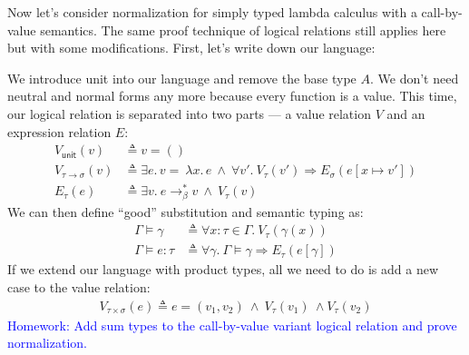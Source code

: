 \documentclass{notes}
\begin{document}
Now let's consider normalization for simply typed lambda calculus with a call-by-value semantics.
%
The same proof technique of logical relations still applies here but with some modifications.
%
First, let's write down our language:
%
\begin{syntax}
  \category[Types]{\tau, \sigma}
  \alternative{\tau \rightarrow \sigma}

  \alternative{()}

  \alternative{()}
\end{syntax}
%
We introduce unit into our language and remove the base type $A$.
%
We don't need neutral and normal forms any more because every function is a value.
%
This time, our logical relation is separated into two parts --- a value relation $V$ and an expression relation $E$:
%
\begin{align*}
  V_{\textsf{unit}}(v) & \triangleq v = () \\
  V_{\tau \rightarrow \sigma}(v) & \triangleq \exists e.\, v=\ \lambda x.\, e \ \wedge \ \forall v'.\ V_{\tau}(v') \Longrightarrow E_{\sigma}(e[x\mapsto v']) \\
  E_{\tau}(e) & \triangleq \exists v.\ e \longrightarrow_{\beta}^* v \ \wedge \ V_{\tau}(v)
\end{align*}
%
We can then define ``good'' substitution and semantic typing as:
%
\begin{align*}
  \Gamma \vDash \gamma & \triangleq \forall x : \tau \in \Gamma.\ V_{\tau}(\gamma(x)) \\
  \Gamma \vDash e : \tau & \triangleq \forall \gamma.\: \Gamma \vDash \gamma \Longrightarrow E_{\tau}(e[\gamma])
\end{align*}
%
If we extend our language with product types, all we need to do is add a new case to the value relation:
%
\begin{align*}
  V_{\tau \times \sigma}(e) \triangleq e = (v_1, v_2) \ \wedge \ V_\tau(v_1) \ \wedge V_\tau(v_2)
\end{align*}
%
\textcolor{blue}{Homework: Add sum types to the call-by-value variant logical relation and prove normalization.}
\end{document}
